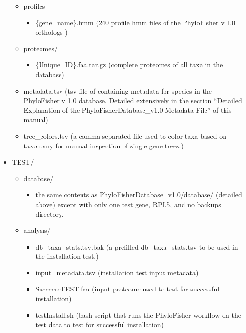 \documentclass{article}
\begin{document}
\begin{itemize}
\begin{itemize}
\begin{itemize}
                        \end{itemize}
                    \item profiles
                        \begin{itemize}
                            \item \{gene\_name\}.hmm (240 profile hmm files of the PhyloFisher v 1.0 orthologs )
                        \end{itemize}
                    \item proteomes/
                        \begin{itemize}
                            \item \{Unique\_ID\}.faa.tar.gz (complete proteomes of all taxa in the database)                
                        \end{itemize}
                    \item metadata.tsv (tsv file of containing metadata for species in the PhyloFisher v 1.0 database. Detailed extensively  in the section “Detailed Explanation of the PhyloFisherDatabase\_v1.0 Metadata File” of this manual)
                     \item tree\_colors.tsv (a comma separated file used to color taxa based on taxonomy for manual inspection of single gene trees.)
                \end{itemize}
        \item TEST/
            \begin{itemize}
                \item database/
                    \begin{itemize}
                        \item the same contents as  PhyloFisherDatabase\_v1.0/database/ (detailed above) except with only one test gene, RPL5, and no backups directory. 
                    \end{itemize}
                \item analysis/
                    \begin{itemize}
                        \item db\_taxa\_stats.tsv.bak (a prefilled db\_taxa\_stats.tsv to be used in the installation test.)
                        \item input\_metadata.tsv (installation test input metadata)
                        \item SacccereTEST.faa (input proteome used to test for successful installation)
                        \item testInstall.sh (bash script that runs the PhyloFisher workflow on the test data to test for successful installation)
                    \end{itemize}
            \end{itemize}
        \end{itemize}
        
\end{document}
